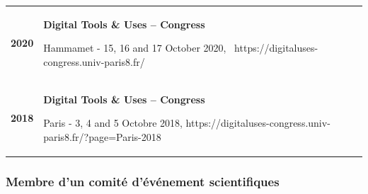 \documentclass[
  a4paper,
  DIV=11,
  numbers=noendperiod]{scrreprt}
\begin{document}
\begin{longtable}[]{@{}
  >{\raggedright\arraybackslash}p{}
  >{\raggedright\arraybackslash}p{}@{}}
\toprule\noalign{}
\endhead
\bottomrule\noalign{}
\endlastfoot
\textbf{2020} & \textbf{Digital Tools \& Uses -- Congress}

Hammamet - 15, 16 and 17 October 2020,~
https://digitaluses-congress.univ-paris8.fr/ \\
\textbf{2018} & \textbf{Digital Tools \& Uses -- Congress}

Paris - 3, 4 and 5 Octobre 2018,
https://digitaluses-congress.univ-paris8.fr/?page=Paris-2018 \\
\end{longtable}

\subsubsection{Membre d'un comité d'événement
scientifiques}\label{membre-dun-comituxe9-duxe9vuxe9nement-scientifiques}
\end{document}

